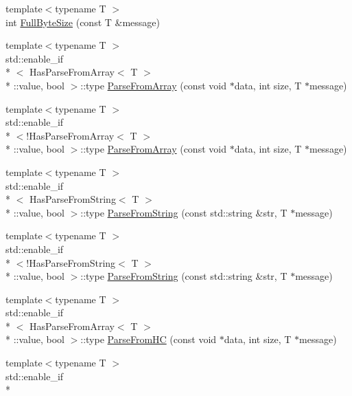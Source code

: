 \begin{DoxyCompactItemize}
\item 
{\footnotesize template$<$typename T $>$ }\\int \hyperlink{namespaceapollo_1_1cyber_1_1message_abd3f08d8fd1f9a79b1da4d782c73fc48}{Full\-Byte\-Size} (const T \&message)
\item 
{\footnotesize template$<$typename T $>$ }\\std\-::enable\-\_\-if\\*
$<$ Has\-Parse\-From\-Array$<$ T $>$\\*
\-::value, bool $>$\-::type \hyperlink{namespaceapollo_1_1cyber_1_1message_aeb045f496b533d2e1f405d8588f9b279}{Parse\-From\-Array} (const void $\ast$data, int size, T $\ast$message)
\item 
{\footnotesize template$<$typename T $>$ }\\std\-::enable\-\_\-if\\*
$<$!Has\-Parse\-From\-Array$<$ T $>$\\*
\-::value, bool $>$\-::type \hyperlink{namespaceapollo_1_1cyber_1_1message_a5808d28d4a46e2a0ca378526c25b1e37}{Parse\-From\-Array} (const void $\ast$data, int size, T $\ast$message)
\item 
{\footnotesize template$<$typename T $>$ }\\std\-::enable\-\_\-if\\*
$<$ Has\-Parse\-From\-String$<$ T $>$\\*
\-::value, bool $>$\-::type \hyperlink{namespaceapollo_1_1cyber_1_1message_ac7c65d89fac88eda8ae486507c260f39}{Parse\-From\-String} (const std\-::string \&str, T $\ast$message)
\item 
{\footnotesize template$<$typename T $>$ }\\std\-::enable\-\_\-if\\*
$<$!Has\-Parse\-From\-String$<$ T $>$\\*
\-::value, bool $>$\-::type \hyperlink{namespaceapollo_1_1cyber_1_1message_a447d1039d8ca437c0bb1a3f620154092}{Parse\-From\-String} (const std\-::string \&str, T $\ast$message)
\item 
{\footnotesize template$<$typename T $>$ }\\std\-::enable\-\_\-if\\*
$<$ Has\-Parse\-From\-Array$<$ T $>$\\*
\-::value, bool $>$\-::type \hyperlink{namespaceapollo_1_1cyber_1_1message_aabb2d1760d1f1755b1682813b0f39b6f}{Parse\-From\-H\-C} (const void $\ast$data, int size, T $\ast$message)
\item 
{\footnotesize template$<$typename T $>$ }\\std\-::enable\-\_\-if\\*

\end{DoxyCompactItemize}
